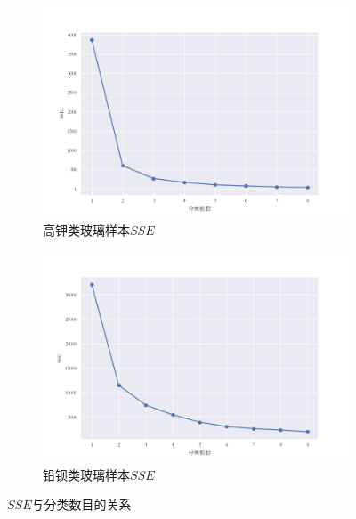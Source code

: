\documentclass[withoutpreface,bwprint]{cumcmthesis}
\begin{document}
\begin{figure}[H]
	\begin{subfigure}[t]{.515\linewidth}
	\centering
	\includegraphics[width=.9\linewidth]{高钾类SSE.png}
	\caption{高钾类玻璃样本$SSE$}
	\label{fig:高钾类玻璃样本$SSE$}
	\end{subfigure}
	\begin{subfigure}[t]{.515\linewidth}
	\centering
	\includegraphics[width=.9\linewidth]{铅钡类SSE.png}
	\caption{铅钡类玻璃样本$SSE$}
	\label{铅钡类玻璃样本$SSE$}
	\end{subfigure}
	\caption{$SSE$与分类数目的关系}
	\end{figure}
\end{document}
